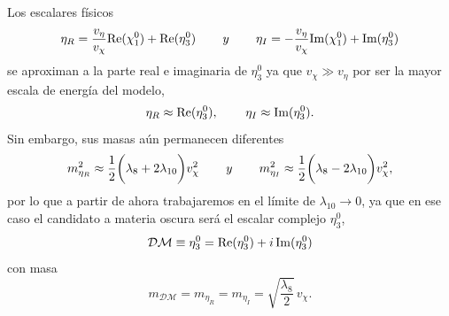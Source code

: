 Los escalares físicos
\begin{equation}
\eta_R = \frac{v_\eta}{v_\chi} \text{Re}(\chi_1^0) + \text{Re}(\eta_3^0) \hspace{0.3in} y \hspace{0.3in} \eta_I = -\frac{v_\eta}{v_\chi} \text{Im}(\chi_1^0) + \text{Im}(\eta_3^0)
\end{equation}
se aproximan a la parte real e imaginaria de $\eta_3^0$ ya que $v_\chi \gg v_\eta$ por ser la mayor escala de energía del modelo,
\begin{equation}
\eta_R \approx \text{Re}(\eta_3^0), \hspace{0.3in} \eta_I \approx \text{Im}(\eta_3^0).
\end{equation}
Sin embargo, sus masas aún permanecen diferentes
\begin{equation}
m_{\eta_R}^2 \approx \frac{1}{2} \bigg( \lambda_8 +2\lambda_{10}  \bigg) v_\chi^2 \hspace{0.3in} y \hspace{0.3in} m_{\eta_I}^2 \approx \frac{1}{2} \bigg( \lambda_8 -2\lambda_{10}  \bigg) v_\chi^2,
\end{equation}
por lo que a partir de ahora trabajaremos en el límite de $\lambda_{10} \to 0$, ya que en ese caso el candidato a materia oscura será el escalar complejo $\eta_3^0$, 
\begin{equation}
\mathcal{DM} \equiv \eta_3^0 =  {\rm Re}(\eta_3^0) + i \, {\rm Im}(\eta_3^0)
\end{equation}
con masa
\begin{equation}
m_\mathcal{DM}=m_{\eta_R}=m_{\eta_I} = \sqrt{\frac{\lambda_8}{2} } \, v_\chi.
\end{equation}






